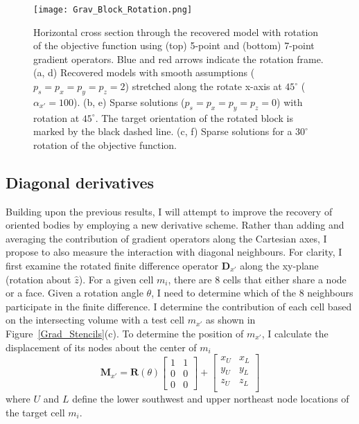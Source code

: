 \begin{figure}[h!]
\texttt{[image: Grav\_Block\_Rotation.png]}
\caption{Horizontal cross section through the recovered model with rotation of the objective function using (top) 5-point and (bottom) 7-point gradient operators. Blue and red arrows indicate the rotation frame. (a, d) Recovered models with smooth assumptions ($p_s=p_x=p_y=p_z=2$) stretched along the rotate x-axis at $45^\circ$ ($\alpha_{x'}=100$). (b, e) Sparse solutions ($p_s=p_x=p_y=p_z=0$) with rotation at $45^\circ$. The target orientation of the rotated block is marked by the black dashed line. (c, f) Sparse solutions for a $30^\circ$ rotation of the objective function.}
\label{BlockModelRotated}
\end{figure}

\subsection{Diagonal derivatives}
Building upon the previous results, I will attempt to improve the recovery of oriented bodies by employing a new derivative scheme.
Rather than adding and averaging the contribution of gradient operators along the Cartesian axes, I propose to also measure the interaction with diagonal neighbours. For clarity, I first examine the rotated finite difference operator $\mathbf{D}_{x'}$ along the xy-plane (rotation about $\hat z$).
For a given cell $m_i$, there are 8 cells that either share a node or a face. Given a rotation angle $\theta$, I need to determine which of the 8 neighbours participate in the finite difference. I determine the contribution of each cell based on the intersecting volume with a test cell $m_{x'}$ as shown in Figure~\ref{Grad_Stencils}(c). To determine the position of $m_{x'}$, I calculate the displacement of its nodes about the center of $m_i$
\begin{equation}\label{rotUnitVector}
	\mathbf{M}_{x'} = \mathbf{R}(\theta)
	\begin{bmatrix}
	1 & 1 \\ 0& 0 \\ 0 & 0
	\end{bmatrix} +
	\begin{bmatrix}
	x_U & x_L \\ y_U & y_L \\ z_U & z_L\\
	\end{bmatrix}
\end{equation}
where $U$ and $L$ define the lower southwest and upper northeast node locations of the target cell $m_i$.
